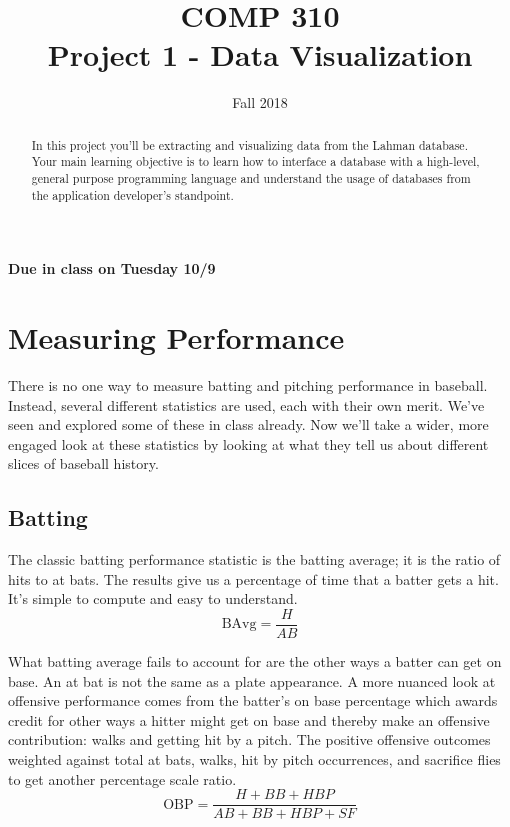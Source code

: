 \documentclass[10pt]{article}
\title{COMP 310 \\ Project 1 - Data Visualization}
\author{  }
\date{Fall 2018}
\begin{document}
\maketitle

\begin{abstract}
In this project you'll be extracting and visualizing data from the Lahman database. Your main learning objective is to learn how to interface a database with a high-level, general purpose programming language and understand the usage of databases from the application developer's standpoint.
\end{abstract}

\begin{center}
\textbf{Due in class on Tuesday 10/9}
\end{center}


\section*{Measuring Performance}

There is no one way to measure batting and pitching performance in baseball.  Instead, several different statistics are used, each with their own merit.  We've seen and explored some of these in class already. Now we'll take a wider, more engaged look at these statistics by looking at what they tell us about different slices of baseball history.

\subsection*{Batting}

The classic batting performance statistic is the batting average; it is the ratio of hits to at bats. The results give us a percentage of time that a batter gets a hit. It's simple to compute and easy to understand.
\begin{equation}
  \mbox{BAvg} = \frac{H}{AB}
\end{equation}

What batting average fails to account for are the other ways a batter can get on base.  An at bat is not the same as a plate appearance. A more nuanced look at offensive performance comes from the batter's on base percentage which awards credit for other ways a hitter might get on base and thereby make an offensive contribution: walks and getting hit by a pitch.  The positive offensive outcomes weighted against total at bats, walks, hit by pitch occurrences, and sacrifice flies to get another percentage scale ratio.
\begin{equation}
  \mbox{OBP} = \frac{H+BB+HBP}{AB+BB+HBP+SF}
\end{equation}
\end{document}
